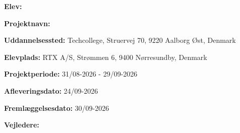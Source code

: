 
\begin{center}
  {\Huge \textbf{\projectname}}

  \vspace*{\fill}

  {\Large \textbf{\student}}

  \vspace*{\fill}

  {\large \textbf{\projecttype}}
\end{center}

\thispagestyle{empty}

\newpage
\begin{center}
  {\large \textbf{Elev:} \student}
  \vspace*{\fill}

  {\large \textbf{Projektnavn:} \projectname}
  \vspace*{\fill}

  {\large \textbf{Uddannelsessted:} Techcollege, Struervej 70, 9220 Aalborg Øst, Denmark}
  \vspace*{\fill}

  {\large \textbf{Elevplads:} RTX A/S, Strømmen 6, 9400 Nørresundby, Denmark}
  \vspace*{\fill}

  {\large \textbf{Projektperiode:} 31/08-2026 - 29/09-2026}
  \vspace*{\fill}

  {\large \textbf{Afleveringsdato:} 24/09-2026}
  \vspace*{\fill}

  {\large \textbf{Fremlæggelsesdato:} 30/09-2026}
  \vspace*{\fill}

  {\large \textbf{Vejledere:} \supervisors}
  \vspace*{\fill}

\end{center}

\thispagestyle{empty}
